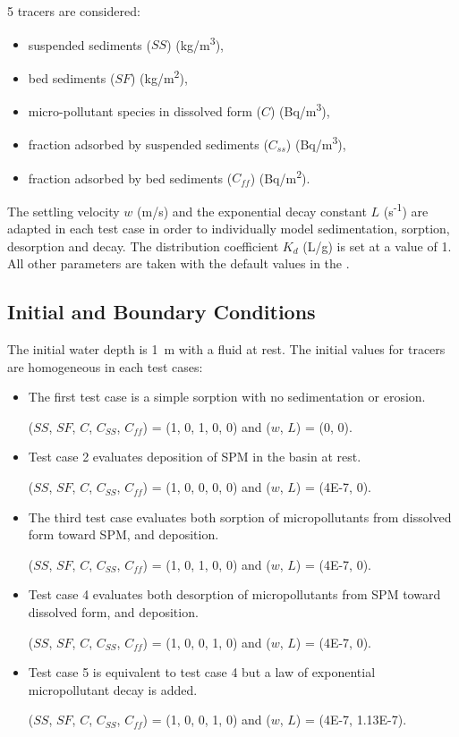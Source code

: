 5 tracers are considered:
\begin{itemize}
\item suspended sediments ($SS$) (kg/m\textsuperscript{3}),
\item bed sediments ($SF$) (kg/m\textsuperscript{2}),
\item micro-pollutant species in dissolved form ($C$) (Bq/m\textsuperscript{3}),
\item fraction adsorbed by suspended sediments ($C_{ss}$) (Bq/m\textsuperscript{3}),
\item fraction adsorbed by bed sediments ($C_{ff}$) (Bq/m\textsuperscript{2}).
\end{itemize}

The settling velocity $w$ (m/s) and the exponential decay constant $L$
(s\textsuperscript{-1}) are adapted in each test case in order to individually
model sedimentation, sorption, desorption and decay. The distribution
coefficient $K_d$ (L/g) is set at a value of 1. All other parameters
are taken with the default values in the \waqtel {}.

\subsection{Initial and Boundary Conditions}
The initial water depth is 1~m with a fluid at rest.
The initial values for tracers are homogeneous in each test cases:\\
\begin{itemize}
  \item
    The first test case is a simple sorption with no sedimentation or erosion.

    ($SS$, $SF$, $C$, $C_{SS}$, $C_{ff}$) = (1, 0, 1, 0, 0) and ($w$, $L$) = (0, 0).\\
  \item
    Test case 2 evaluates deposition of SPM in the basin at rest.

($SS$, $SF$, $C$, $C_{SS}$, $C_{ff}$) = (1, 0, 0, 0, 0) and ($w$, $L$) = (4E-7, 0).\\
\item
  The third test case evaluates both sorption of micropollutants from
  dissolved form toward SPM, and deposition.

($SS$, $SF$, $C$, $C_{SS}$, $C_{ff}$) = (1, 0, 1, 0, 0) and ($w$, $L$) = (4E-7, 0).\\
  \item
    Test case 4 evaluates both desorption of micropollutants from SPM
    toward dissolved form, and deposition.

 ($SS$, $SF$, $C$, $C_{SS}$, $C_{ff}$) = (1, 0, 0, 1, 0) and ($w$, $L$) = (4E-7, 0).\\
  \item
    Test case 5 is equivalent to test case 4 but a law of exponential
    micropollutant decay is added.

($SS$, $SF$, $C$, $C_{SS}$, $C_{ff}$) = (1, 0, 0, 1, 0) and ($w$, $L$) = (4E-7, 1.13E-7).\\
\end{itemize}

